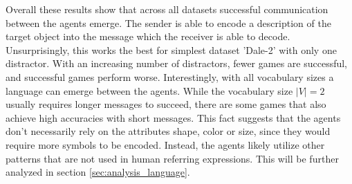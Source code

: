 Overall these results show that across all datasets successful communication between the agents emerge.
The sender is able to encode a description of the target object into the message which the receiver is able to decode.
Unsurprisingly, this works the best for simplest dataset 'Dale-2' with only one distractor.
With an increasing number of distractors, fewer games are successful, and successful games perform worse.
Interestingly, with all vocabulary sizes a language can emerge between the agents.
While the vocabulary size $|V|=2$ usually requires longer messages to succeed, there are some games that also achieve high accuracies with short messages.
This fact suggests that the agents don't necessarily rely on the attributes shape, color or size, since they would require more symbols to be encoded.
Instead, the agents likely utilize other patterns that are not used in human referring expressions.
This will be further analyzed in section \ref{sec:analysis_language}.